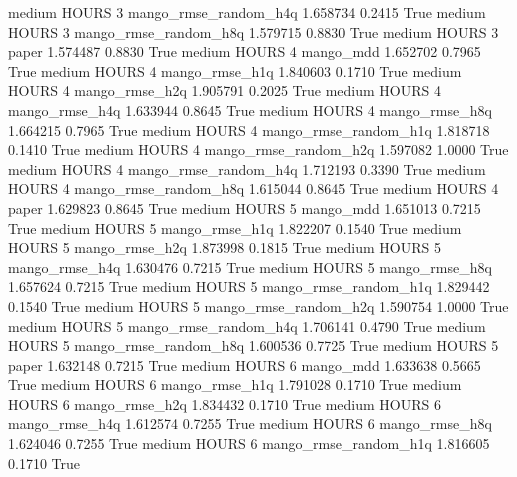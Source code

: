     medium    HOURS                 3 mango_rmse_random_h4q   1.658734      0.2415    True
    medium    HOURS                 3 mango_rmse_random_h8q   1.579715      0.8830    True
    medium    HOURS                 3                 paper   1.574487      0.8830    True
    medium    HOURS                 4             mango_mdd   1.652702      0.7965    True
    medium    HOURS                 4        mango_rmse_h1q   1.840603      0.1710    True
    medium    HOURS                 4        mango_rmse_h2q   1.905791      0.2025    True
    medium    HOURS                 4        mango_rmse_h4q   1.633944      0.8645    True
    medium    HOURS                 4        mango_rmse_h8q   1.664215      0.7965    True
    medium    HOURS                 4 mango_rmse_random_h1q   1.818718      0.1410    True
    medium    HOURS                 4 mango_rmse_random_h2q   1.597082      1.0000    True
    medium    HOURS                 4 mango_rmse_random_h4q   1.712193      0.3390    True
    medium    HOURS                 4 mango_rmse_random_h8q   1.615044      0.8645    True
    medium    HOURS                 4                 paper   1.629823      0.8645    True
    medium    HOURS                 5             mango_mdd   1.651013      0.7215    True
    medium    HOURS                 5        mango_rmse_h1q   1.822207      0.1540    True
    medium    HOURS                 5        mango_rmse_h2q   1.873998      0.1815    True
    medium    HOURS                 5        mango_rmse_h4q   1.630476      0.7215    True
    medium    HOURS                 5        mango_rmse_h8q   1.657624      0.7215    True
    medium    HOURS                 5 mango_rmse_random_h1q   1.829442      0.1540    True
    medium    HOURS                 5 mango_rmse_random_h2q   1.590754      1.0000    True
    medium    HOURS                 5 mango_rmse_random_h4q   1.706141      0.4790    True
    medium    HOURS                 5 mango_rmse_random_h8q   1.600536      0.7725    True
    medium    HOURS                 5                 paper   1.632148      0.7215    True
    medium    HOURS                 6             mango_mdd   1.633638      0.5665    True
    medium    HOURS                 6        mango_rmse_h1q   1.791028      0.1710    True
    medium    HOURS                 6        mango_rmse_h2q   1.834432      0.1710    True
    medium    HOURS                 6        mango_rmse_h4q   1.612574      0.7255    True
    medium    HOURS                 6        mango_rmse_h8q   1.624046      0.7255    True
    medium    HOURS                 6 mango_rmse_random_h1q   1.816605      0.1710    True
